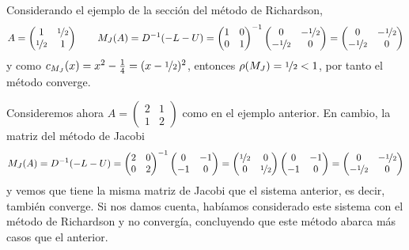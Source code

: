 \begin{ejem}
    Considerando el ejemplo de la sección del método de Richardson, 
    $$A= \begin{pmatrix}
            1 & \nicefrac{1}{2} \\
            \nicefrac{1}{2} & 1
        \end{pmatrix} \qquad M_J(A)=D^{-1}(-L-U)=\begin{pmatrix}
            1 &0 \\
           0 & 1
        \end{pmatrix}^{-1}\begin{pmatrix}
            0 & -\nicefrac{1}{2} \\
            -\nicefrac{1}{2} & 0
        \end{pmatrix}=\begin{pmatrix}
            0 & -\nicefrac{1}{2} \\
            -\nicefrac{1}{2} & 0
        \end{pmatrix}$$
        y como $c_{M_J}(x)=x^2-\frac{1}{4}=(x-\nicefrac{1}{2})^2$, entonces $\rho(M_J)=\nicefrac{1}{2}<1$, por tanto el método converge.  

        Consideremos ahora $A=(\begin{smallmatrix}
            2 & 1 \\ 1 & 2
        \end{smallmatrix})$ como en el ejemplo anterior. En cambio, la matriz del método de Jacobi
        $$M_J(A)=D^{-1}(-L-U)=\begin{pmatrix}
            2 & 0 \\ 0 & 2
        \end{pmatrix}^{-1} \begin{pmatrix}
            0 & -1 \\ -1 & 0
        \end{pmatrix} = \begin{pmatrix}
            \nicefrac{1}{2} & 0 \\ 0 & \nicefrac{1}{2} 
        \end{pmatrix}\begin{pmatrix}
            0 & -1 \\ -1 & 0
        \end{pmatrix} = \begin{pmatrix}
            0 & -\nicefrac{1}{2} \\
            -\nicefrac{1}{2} & 0
        \end{pmatrix}$$
    y vemos que tiene la misma matriz de Jacobi que el sistema anterior, es decir, también converge. Si nos damos cuenta, habíamos considerado este sistema con el método de Richardson y no convergía, concluyendo que este método abarca más casos que el anterior. 
\end{ejem}
